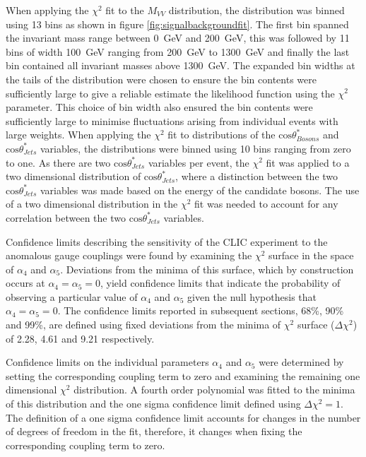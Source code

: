 When applying the $\chi^{2}$ fit to the $M_{VV}$ distribution, the distribution was binned using 13 bins as shown in figure \ref{fig:signalbackgroundfit}.  The first bin spanned the invariant mass range between 0~GeV and 200~GeV, this was followed by 11 bins of width 100~GeV ranging from 200~GeV to 1300~GeV and finally the last bin contained all invariant masses above 1300~GeV.  The expanded bin widths at the tails of the distribution were chosen to ensure the bin contents were sufficiently large to give a reliable estimate the likelihood function using the $\chi^{2}$ parameter.  This choice of bin width also ensured the bin contents were sufficiently large to minimise fluctuations arising from individual events with large weights.  When applying the $\chi^{2}$ fit to distributions of the $\text{cos}\theta^{*}_{Bosons}$ and $\text{cos}\theta^{*}_{Jets}$ variables, the distributions were binned using 10 bins ranging from zero to one.  As there are two $\text{cos}\theta^{*}_{Jets}$ variables per event, the $\chi^{2}$ fit was applied to a two dimensional distribution of $\text{cos}\theta^{*}_{Jets}$, where a distinction between the two $\text{cos}\theta^{*}_{Jets}$ variables was made based on the energy of the candidate bosons.  The use of a two dimensional distribution in the $\chi^{2}$ fit was needed to account for any correlation between the two $\text{cos}\theta^{*}_{Jets}$ variables.  

Confidence limits describing the sensitivity of the CLIC experiment to the anomalous gauge couplings were found by examining the $\chi^{2}$ surface in the space of $\alpha_{4}$ and $\alpha_{5}$.  Deviations from the minima of this surface, which by construction occurs at $\alpha_{4} = \alpha_{5} = 0$, yield confidence limits that indicate the probability of observing a particular value of $\alpha_{4}$ and $\alpha_{5}$ given the null hypothesis that $\alpha_{4} = \alpha_{5} = 0$.  The confidence limits reported in subsequent sections, 68\%, 90\% and 99\%, are defined using fixed deviations from the minima of $\chi^{2}$ surface ($\Delta\chi^{2}$) of 2.28, 4.61 and 9.21 respectively.

Confidence limits on the individual parameters $\alpha_{4}$ and $\alpha_{5}$ were determined by setting the corresponding coupling term to zero and examining the remaining one dimensional $\chi^{2}$ distribution.  A fourth order polynomial was fitted to the minima of this distribution and the one sigma confidence limit defined using $\Delta\chi^{2} = 1$.  The definition of a one sigma confidence limit accounts for changes in the number of degrees of freedom in the fit, therefore, it changes when fixing the corresponding coupling term to zero.  

